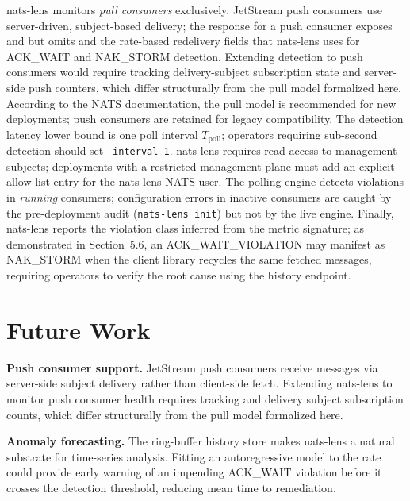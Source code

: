 \documentclass[sigconf,nonacm]{acmart}
\begin{document}
nats-lens monitors \emph{pull consumers} exclusively. JetStream push
consumers use server-driven, subject-based delivery; the
 response for a push consumer exposes
 and  but omits
 and the rate-based redelivery fields
that nats-lens uses for ACK\_WAIT and NAK\_STORM detection.
Extending detection to push consumers would require tracking
delivery-subject subscription state and server-side push counters,
which differ structurally from the pull model formalized here.
According to the NATS documentation, the pull model is recommended
for new deployments; push consumers are retained for legacy compatibility. The detection latency lower bound is one poll interval
$T_\mathrm{poll}$; operators requiring sub-second detection should set
\texttt{--interval 1}. nats-lens requires read access to
 management subjects; deployments with a restricted
management plane must add an explicit allow-list entry for the
nats-lens NATS user. The polling engine detects violations in
\emph{running} consumers; configuration errors in inactive consumers
are caught by the pre-deployment audit (\texttt{nats-lens init}) but
not by the live engine. Finally, nats-lens reports the violation class
inferred from the metric signature; as demonstrated in Section~5.6, an
ACK\_WAIT\_\allowbreak VIOLATION may manifest as NAK\_STORM when the
client library recycles the same fetched messages, requiring operators
to verify the root cause using the history endpoint.

\section{Future Work}

\textbf{Push consumer support.} JetStream push consumers receive messages
via server-side subject delivery rather than client-side fetch. Extending
nats-lens to monitor push consumer health requires tracking
 and delivery subject subscription counts,
which differ structurally from the pull model formalized here.

\textbf{Anomaly forecasting.} The ring-buffer history store makes
nats-lens a natural substrate for time-series analysis. Fitting an
autoregressive model to the  rate could provide
early warning of an impending ACK\_WAIT violation before it crosses the
detection threshold, reducing mean time to remediation.
\end{document}

